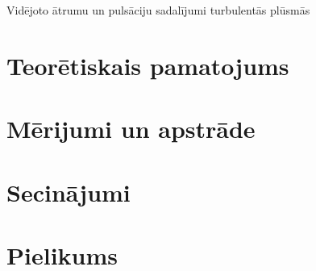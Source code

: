 \documentclass[12pt,letterpaper]{article}
\begin{document}


{\Huge Vidējoto ātrumu un pulsāciju sadalījumi turbulentās plūsmās}\\[5mm]


\section*{Teorētiskais pamatojums}

\section*{Mērijumi un apstrāde}

\pagebreak
\section*{Secinājumi}


\pagebreak
\section*{Pielikums}

	\inputminted[linenos,stepnumber=5,fontsize=\scriptsize]{python}{mymodule.py}
\end{document}
